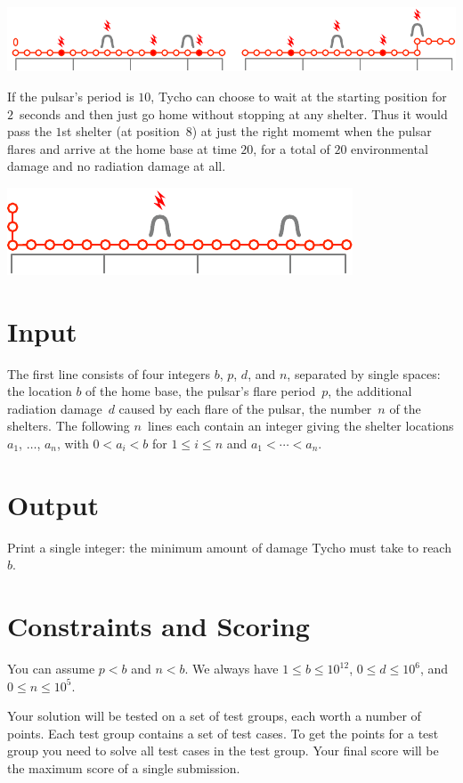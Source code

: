 \includegraphics[width=.8\textwidth]{img/sample1_2.pdf}

If the pulsar's period is $10$, Tycho can choose to wait at the starting position for $2$~seconds and then just go home without stopping at any shelter.
Thus it would pass the $1$st shelter (at position~$8$) at just the right momemt when the pulsar flares and arrive at the home base at time $20$, for a total of $20$ environmental damage and no radiation damage at all.

\includegraphics[width=.4\textwidth]{img/sample3.pdf}

\section*{Input}

The first line consists of four integers $b$, $p$, $d$, and $n$, separated by single spaces:
the location $b$ of the home base,
the pulsar's flare period~$p$,
the additional radiation damage~$d$ caused by each flare of the pulsar,
the number~$n$ of the shelters.
The following $n$~lines each contain an integer giving the shelter locations $a_1$, $\ldots$, $a_n$, with 
$0<a_i< b$ for $1\leq i \leq n$ %
and 
$a_1<\cdots <a_n$. %

\section*{Output}

Print a single integer: the minimum amount of damage Tycho must take to reach $b$.

\section*{Constraints and Scoring}

You can assume
$p < b$ %
and
$n < b$. %
We always have
$1\leq b\leq 10^{12}$, %
$0\leq d \leq 10^6$, %
and
$0\leq n \leq 10^5$. %

Your solution will be tested on a set of test groups, each worth a number of points.
Each test group contains a set of test cases.
To get the points for a test group you need to solve all test cases in the test group.
Your final score will be the maximum score of a single submission.

